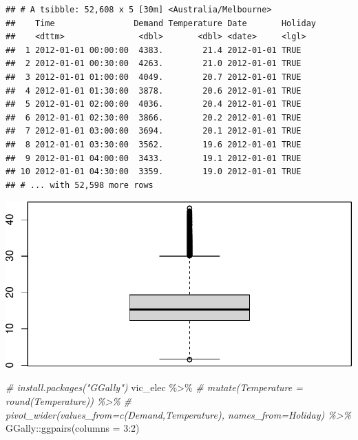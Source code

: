 \documentclass[
]{book}
\newenvironment{Shaded}{\begin{snugshade}}{\end{snugshade}}
\newcommand{\AttributeTok}[1]{\textcolor[rgb]{0.77,0.63,0.00}{#1}}
\newcommand{\CommentTok}[1]{\textcolor[rgb]{0.56,0.35,0.01}{\textit{#1}}}
\newcommand{\DecValTok}[1]{\textcolor[rgb]{0.00,0.00,0.81}{#1}}
\newcommand{\FunctionTok}[1]{\textcolor[rgb]{0.00,0.00,0.00}{#1}}
\newcommand{\NormalTok}[1]{#1}
\newcommand{\SpecialCharTok}[1]{\textcolor[rgb]{0.00,0.00,0.00}{#1}}
\begin{document}
\begin{verbatim}
## # A tsibble: 52,608 x 5 [30m] <Australia/Melbourne>
##    Time                Demand Temperature Date       Holiday
##    <dttm>               <dbl>       <dbl> <date>     <lgl>  
##  1 2012-01-01 00:00:00  4383.        21.4 2012-01-01 TRUE   
##  2 2012-01-01 00:30:00  4263.        21.0 2012-01-01 TRUE   
##  3 2012-01-01 01:00:00  4049.        20.7 2012-01-01 TRUE   
##  4 2012-01-01 01:30:00  3878.        20.6 2012-01-01 TRUE   
##  5 2012-01-01 02:00:00  4036.        20.4 2012-01-01 TRUE   
##  6 2012-01-01 02:30:00  3866.        20.2 2012-01-01 TRUE   
##  7 2012-01-01 03:00:00  3694.        20.1 2012-01-01 TRUE   
##  8 2012-01-01 03:30:00  3562.        19.6 2012-01-01 TRUE   
##  9 2012-01-01 04:00:00  3433.        19.1 2012-01-01 TRUE   
## 10 2012-01-01 04:30:00  3359.        19.0 2012-01-01 TRUE   
## # ... with 52,598 more rows
\end{verbatim}

\begin{Shaded}
\end{Shaded}

\includegraphics{graphics/unnamed-chunk-22-1.pdf}

\begin{Shaded}
\begin{Highlighting}[]
\CommentTok{\# install.packages("GGally")}
\NormalTok{vic\_elec }\SpecialCharTok{\%\textgreater{}\%}
  \CommentTok{\# mutate(Temperature = round(Temperature)) \%\textgreater{}\%}
  \CommentTok{\# pivot\_wider(values\_from=c(Demand,Temperature), names\_from=Holiday) \%\textgreater{}\%}
\NormalTok{  GGally}\SpecialCharTok{::}\FunctionTok{ggpairs}\NormalTok{(}\AttributeTok{columns =} \DecValTok{3}\SpecialCharTok{:}\DecValTok{2}\NormalTok{)}
\end{Highlighting}
\end{Shaded}
\end{document}
